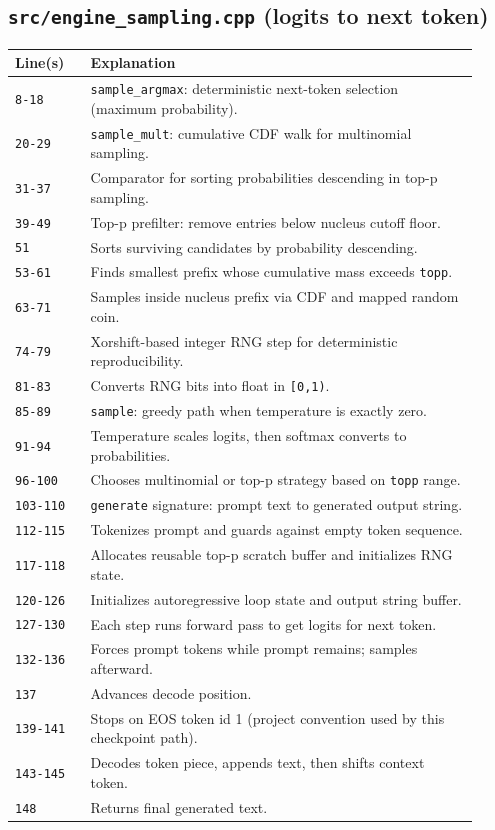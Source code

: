 \documentclass[11pt]{article}
\begin{document}
\subsection{\texttt{src/engine\_sampling.cpp} (logits to next token)}
\begin{longtable}{p{0.15\linewidth} p{0.77\linewidth}}
\toprule
\textbf{Line(s)} & \textbf{Explanation} \\
\midrule
\endhead
\texttt{8-18} & \texttt{sample\_argmax}: deterministic next-token selection (maximum probability). \\
\texttt{20-29} & \texttt{sample\_mult}: cumulative CDF walk for multinomial sampling. \\
\texttt{31-37} & Comparator for sorting probabilities descending in top-p sampling. \\
\texttt{39-49} & Top-p prefilter: remove entries below nucleus cutoff floor. \\
\texttt{51} & Sorts surviving candidates by probability descending. \\
\texttt{53-61} & Finds smallest prefix whose cumulative mass exceeds \texttt{topp}. \\
\texttt{63-71} & Samples inside nucleus prefix via CDF and mapped random coin. \\
\texttt{74-79} & Xorshift-based integer RNG step for deterministic reproducibility. \\
\texttt{81-83} & Converts RNG bits into float in \texttt{[0,1)}. \\
\texttt{85-89} & \texttt{sample}: greedy path when temperature is exactly zero. \\
\texttt{91-94} & Temperature scales logits, then softmax converts to probabilities. \\
\texttt{96-100} & Chooses multinomial or top-p strategy based on \texttt{topp} range. \\
\texttt{103-110} & \texttt{generate} signature: prompt text to generated output string. \\
\texttt{112-115} & Tokenizes prompt and guards against empty token sequence. \\
\texttt{117-118} & Allocates reusable top-p scratch buffer and initializes RNG state. \\
\texttt{120-126} & Initializes autoregressive loop state and output string buffer. \\
\texttt{127-130} & Each step runs forward pass to get logits for next token. \\
\texttt{132-136} & Forces prompt tokens while prompt remains; samples afterward. \\
\texttt{137} & Advances decode position. \\
\texttt{139-141} & Stops on EOS token id 1 (project convention used by this checkpoint path). \\
\texttt{143-145} & Decodes token piece, appends text, then shifts context token. \\
\texttt{148} & Returns final generated text. \\
\bottomrule
\end{longtable}
\end{document}
